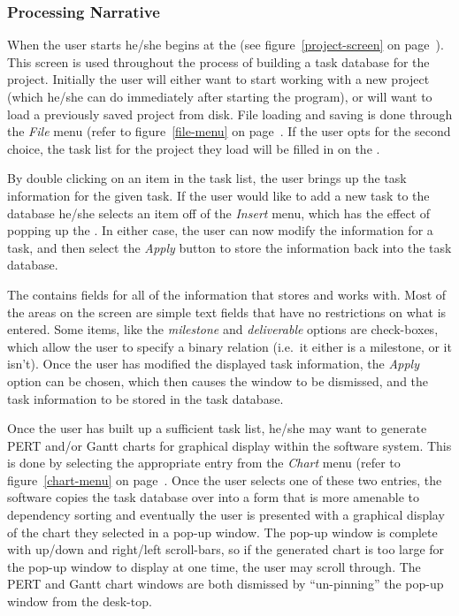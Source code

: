 \subsubsection{Processing Narrative}

When the user starts \xplan\/ he/she begins at the \pscreen (see
figure~\ref{project-screen} on page~\pageref{project-screen}).  This
screen is used throughout the process of building a task database for
the project.  Initially the user will either want to start working
with a new project (which he/she can do immediately after starting the
program), or will want to load a previously saved project from disk.
File loading and saving is done through the {\em File}\/ menu (refer to
figure~\ref{file-menu} on page~\pageref{file-menu}.  If the user opts
for the second choice, the task list for the project they load will be
filled in on the \pscreen.

By double clicking on an item in the task list, the user brings up the
task information for the given task.  If the user would like to add a
new task to the database he/she selects an item off of the {\em
Insert}\/ menu, which has the effect of popping up the \tiscreen.  In
either case, the user can now modify the information for a task, and
then select the {\em Apply}\/ button to store the information back
into the task database.

The \tiscreen\/ contains fields for all of the information that
\xplan\/ stores and works with.  Most of the areas on the screen are
simple text fields that have no restrictions on what is entered.  Some
items, like the {\em milestone}\/ and {\em deliverable}\/ options are
check-boxes, which allow the user to specify a binary relation (i.e.\
it either is a milestone, or it isn't).  Once the user has modified
the displayed task information, the {\em Apply}\/ option can be chosen,
which then causes the window to be dismissed, and the task information
to be stored in the task database.

Once the user has built up a sufficient task list, he/she may want to
generate PERT and/or Gantt charts for graphical display within the
software system.  This is done by selecting the appropriate entry from
the {\em Chart}\/ menu (refer to figure~\ref{chart-menu} on 
page~\pageref{chart-menu}.  Once the user selects one of these two entries,
the software copies the task database over into a form that is more
amenable to dependency sorting and eventually the user is presented
with a graphical display of the chart they selected in a pop-up
window.  The pop-up window is complete with up/down and right/left
scroll-bars, so if the generated chart is too large for the pop-up
window to display at one time, the user may scroll through.  The PERT
and Gantt chart windows are both dismissed by ``un-pinning'' the
pop-up window from the desk-top.

